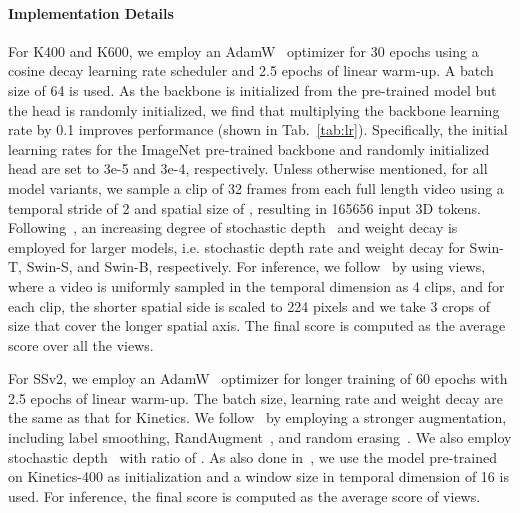 \documentclass{article}
\begin{document}
\paragraph{Implementation Details}
For K400 and K600, we employ an AdamW~\cite{kingma2014adam} optimizer for 30 epochs using a cosine decay learning rate scheduler and 2.5 epochs of linear warm-up. A batch size of 64 is used. As the backbone is initialized from the pre-trained model but the head is randomly initialized, we find that multiplying the backbone learning rate by 0.1 improves performance (shown in Tab.~\ref{tab:lr}). 
Specifically, the initial learning rates for the ImageNet pre-trained backbone and randomly initialized head are set to 3e-5 and 3e-4, respectively.
Unless otherwise mentioned, for all model variants, we sample a clip of 32 frames from each full length video using a temporal stride of 2 and spatial size of , resulting in 165656 input 3D tokens.
Following~\cite{liu2021swin}, an increasing degree of stochastic depth~\cite{huang2016deep} and weight decay is employed for larger models, i.e.  stochastic depth rate and  weight decay for Swin-T, Swin-S, and Swin-B, respectively.
For inference, we follow~\cite{arnab2021vivit} by using  views, where a video is uniformly sampled in the temporal dimension as 4 clips, and for each clip, the shorter spatial side is scaled to 224 pixels and we take 3 crops of size  that cover the longer spatial axis. The final score is computed as the average score over all the views.

For SSv2, we employ an AdamW~\cite{kingma2014adam} optimizer for longer training of 60 epochs with 2.5 epochs of linear warm-up. The batch size, learning rate and weight decay are the same as that for Kinetics. We follow~\cite{mvit2021} by employing a stronger augmentation, including label smoothing, RandAugment~\cite{cubuk2020randaugment}, and random erasing~\cite{zhong2020random}. We also employ stochastic depth~\cite{huang2016deep} with ratio of . As also done in~\cite{mvit2021}, we use the model pre-trained on Kinetics-400 as initialization and a window size in temporal dimension of 16 is used. For inference, the final score is computed as the average score of  views.
\end{document}
